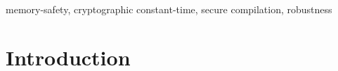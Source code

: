 \documentclass[dvipsnames,conference]{IEEEtran}
\theoremstyle{definition}
\begin{document}
\begin{IEEEkeywords}
  memory-safety, cryptographic constant-time, secure compilation, robustness
\end{IEEEkeywords}

\section{Introduction}\label{sec:introduction}


\end{document}
